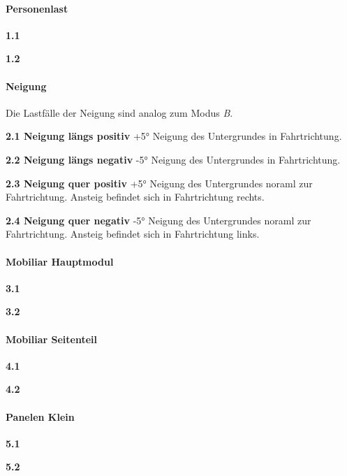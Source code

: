 \paragraph{Personenlast}
\begin{description}
  \item \textbf{1.1 }
  \item \textbf{1.2 }
\end{description}

\paragraph{Neigung}
Die Lastfälle der Neigung sind analog zum Modus \emph{B}.
\begin{description}
  \item \textbf{2.1 Neigung längs positiv} +5° Neigung des Untergrundes in Fahrtrichtung.
  \item \textbf{2.2 Neigung längs negativ} -5° Neigung des Untergrundes in Fahrtrichtung.
  \item \textbf{2.3 Neigung quer positiv} +5° Neigung des Untergrundes noraml zur Fahrtrichtung. Ansteig befindet sich in Fahrtrichtung rechts.
  \item \textbf{2.4 Neigung quer negativ} -5° Neigung des Untergrundes noraml zur Fahrtrichtung. Ansteig befindet sich in Fahrtrichtung links.
\end{description}

\paragraph{Mobiliar Hauptmodul}
\begin{description}
  \item \textbf{3.1 }
  \item \textbf{3.2 }
\end{description}

\paragraph{Mobiliar Seitenteil}
\begin{description}
  \item \textbf{4.1 }
  \item \textbf{4.2 }
\end{description}

\paragraph{Panelen Klein}
\begin{description}
  \item \textbf{5.1 }
  \item \textbf{5.2 }
\end{description}

